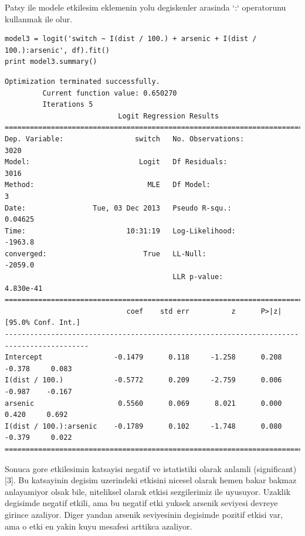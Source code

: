 \documentclass[12pt,fleqn]{article}\usepackage{../common}
\begin{document}
Patsy ile modele etkilesim eklemenin yolu degiskenler arasinda `:`
operatorunu kullanmak ile olur.

\begin{verbatim}
model3 = logit('switch ~ I(dist / 100.) + arsenic + I(dist / 100.):arsenic', df).fit()
print model3.summary()
\end{verbatim}

\begin{verbatim}
Optimization terminated successfully.
         Current function value: 0.650270
         Iterations 5
                           Logit Regression Results                           
==============================================================================
Dep. Variable:                 switch   No. Observations:                 3020
Model:                          Logit   Df Residuals:                     3016
Method:                           MLE   Df Model:                            3
Date:                Tue, 03 Dec 2013   Pseudo R-squ.:                 0.04625
Time:                        10:31:19   Log-Likelihood:                -1963.8
converged:                       True   LL-Null:                       -2059.0
                                        LLR p-value:                 4.830e-41
==========================================================================================
                             coef    std err          z      P>|z|      [95.0% Conf. Int.]
------------------------------------------------------------------------------------------
Intercept                 -0.1479      0.118     -1.258      0.208        -0.378     0.083
I(dist / 100.)            -0.5772      0.209     -2.759      0.006        -0.987    -0.167
arsenic                    0.5560      0.069      8.021      0.000         0.420     0.692
I(dist / 100.):arsenic    -0.1789      0.102     -1.748      0.080        -0.379     0.022
==========================================================================================
\end{verbatim}

Sonuca gore etkilesimin katsayisi negatif ve istatistiki olarak
anlamli (significant) [3]. Bu katsayinin degisim uzerindeki etkisini
nicesel olarak hemen bakar bakmaz anlayamiyor olsak bile, niteliksel
olarak etkisi sezgilerimiz ile uyusuyor. Uzaklik degisimde negatif etkili,
ama bu negatif etki yuksek arsenik seviyesi devreye girince azaliyor.
Diger yandan arsenik seviyesinin degisimde pozitif etkisi var, ama o
etki en yakin kuyu mesafesi arttikca azaliyor. 
\end{document}
